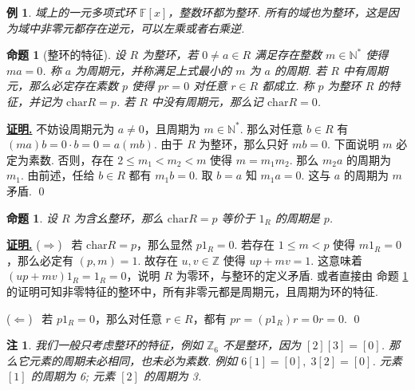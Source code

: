 \documentclass[10pt,openany]{article}
\theoremstyle{thmstyle} %
\theoremstyle{defstyle} %
\theoremstyle{prostyle} %
\newtheorem{proposition}[theorem]{命题}
\newtheorem{example}[theorem]{例}
\newtheorem{remark}[theorem]{注}
\renewenvironment{proof}[1][证明]{\par\underline{\textbf{#1.}} \;\fangsong}{\qed\par}
\begin{document}
\begin{example}
	域上的一元多项式环 \( \mathbb{F}[x] \)，整数环都为整环. 所有的域也为整环，这是因为域中非零元都存在逆元，可以左乘或者右乘逆.
\end{example}

\begin{proposition}[整环的特征]
	设 \( R \) 为整环，若 \( 0 \neq a \in R \) 满足存在整数 \( m \in \mathbb{N}^* \) 使得 \( ma=0 \). 称 \( a \) 为周期元，并称满足上式最小的 \( m \) 为 \( a \) 的周期. 若 \( R \) 中有周期元，那么必定存在素数 \( p \) 使得 \( pr=0 \) 对任意 \( r \in R \) 都成立. 称 \( p \) 为整环 \( R \) 的特征，并记为 \( \mathrm{char} R=p \). 若 \( R \) 中没有周期元，那么记 \( \mathrm{char} R=0 \).
	\label{1.2.23}
\end{proposition}

\begin{proof}
	不妨设周期元为 \( a \neq 0 \)，且周期为 \( m \in \mathbb{N}^* \). 那么对任意 \( b \in R \) 有 \( (ma)b=0 \cdot b=0=a(mb) \). 由于 \( R \) 为整环，那么只好 \( mb=0 \). 下面说明 \( m \) 必定为素数. 否则，存在 \( 2 \leq m_1<m_2<m \) 使得 \( m=m_1m_2 \). 那么 \( m_2a \) 的周期为 \( m_1 \). 由前述，任给 \( b \in R \) 都有 \( m_1b=0 \). 取 \( b=a \) 知 \( m_1a=0 \). 这与 \( a \) 的周期为 \( m \) 矛盾. 
\end{proof}

\begin{proposition}
	设 \( R \) 为含幺整环，那么 \( \mathrm{char} R=p \) 等价于 \( 1_R \) 的周期是 \( p \). 
\end{proposition}

\begin{proof}
	(\(\Rightarrow\)) \ 若 \( \mathrm{char} R=p \)，那么显然 \( p  1_R= 0 \). 若存在 \( 1 \leq m < p \) 使得 \( m 1_R=0 \)，那么必定有 \( (p,m)=1 \). 故存在 \( u,v \in \mathbb{Z} \) 使得 \( up+mv=1 \). 这意味着 \( (up+mv) 1_R= 1_R= 0 \)，说明 \( R \) 为零环，与整环的定义矛盾. 或者直接由
	命题 \ref{1.2.23} 的证明可知非零特征的整环中，所有非零元都是周期元，且周期为环的特征.
	\vspace{1ex}
	
	(\(\Leftarrow\)) \ 若 \( p 1_R=0 \)，那么对任意 \( r \in R \)，都有 \( pr=(p1_R)r=0r=0 \). 
\end{proof}

\begin{remark}
	我们一般只考虑整环的特征，例如 \( \mathbb{Z}_6 \) 不是整环，因为 \( [2][3]=[0] \).  那么它元素的周期未必相同，也未必为素数. 例如 \( 6[1]=[0], \; 3[2]=[0] \). 元素 \( [1] \) 的周期为 6; 元素 \( [2] \) 的周期为 3.
\end{remark}
\end{document}
